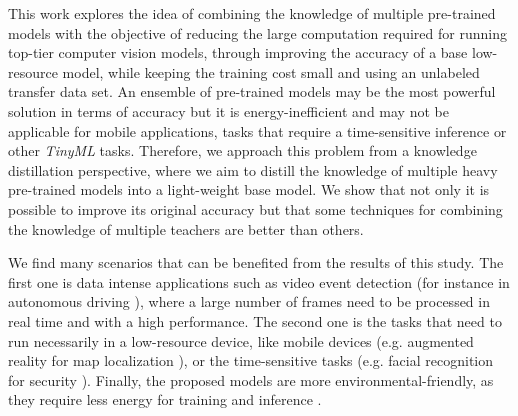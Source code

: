 This work explores the idea of combining the knowledge of multiple pre-trained models with the objective of reducing the large computation required for running top-tier computer vision models, through improving the accuracy of a base low-resource model, while keeping the training cost small and using an unlabeled transfer data set. 	An ensemble of pre-trained models may be the most powerful solution in terms of accuracy but it is energy-inefficient and may not be applicable for mobile applications, tasks that require a time-sensitive inference \autocite{sanchez2020} or other \textit{TinyML} tasks. Therefore, we approach this problem from a knowledge distillation perspective, where we aim to distill the knowledge of multiple heavy pre-trained models into a light-weight base model. We show that not only it is possible to improve its original accuracy but that some techniques for combining the knowledge of multiple teachers are better than others.

We find many scenarios that can be benefited from the results of this study. The first one is data intense applications such as video event detection \autocite{chakraborty2021} (for instance in autonomous driving \autocite{swaminathan2019}), where a large number of frames need to be processed in real time and with a high performance. The second one is the tasks that need to run necessarily in a low-resource device, like mobile devices (e.g. augmented reality for map localization \autocite{limmer2017}), or the time-sensitive tasks (e.g. facial recognition for security \autocite{aung2021}). Finally, the proposed models are more environmental-friendly, as they require less energy for training and inference \autocite{wu2022sustainable}.

